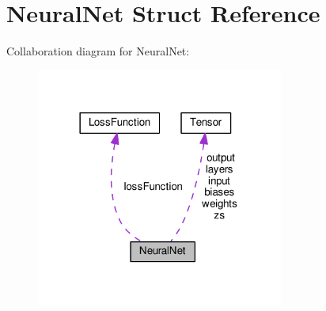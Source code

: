 \hypertarget{structNeuralNet}{}\section{Neural\+Net Struct Reference}
\label{structNeuralNet}


Collaboration diagram for Neural\+Net\+:
\nopagebreak
\begin{figure}[H]
\begin{center}
\leavevmode
\includegraphics[width=230pt]{structNeuralNet__coll__graph}
\end{center}
\end{figure}
